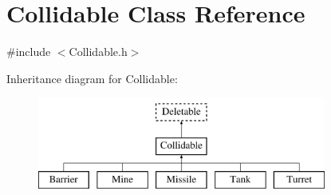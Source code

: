 \hypertarget{classCollidable}{\section{Collidable Class Reference}
\label{classCollidable}
}


{\ttfamily \#include $<$Collidable.\-h$>$}

Inheritance diagram for Collidable\-:\begin{figure}[H]
\begin{center}
\leavevmode
\includegraphics[height=3.000000cm]{classCollidable}
\end{center}
\end{figure}
